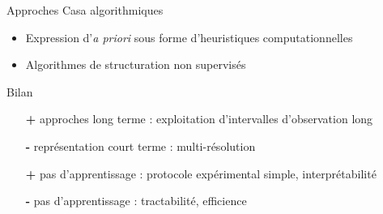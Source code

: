 \begin{frame}{Approches Casa \fg algorithmiques \og}
\begin{itemize}
\item Expression d'\textit{a priori} sous forme d'heuristiques computationnelles
\item Algorithmes de structuration non supervisés
\end{itemize}
\begin{block}{Bilan}
\begin{itemize}
\item[\textbf{+}] approches long terme : exploitation d'intervalles d'observation long
\item[\alert{\textbf{-}}] représentation court terme : multi-résolution
\item[\textbf{+}] pas d'apprentissage : protocole expérimental simple, interprétabilité
\item[\alert{\textbf{-}}] pas d'apprentissage : tractabilité, efficience
\end{itemize}
\end{block}
\end{frame}